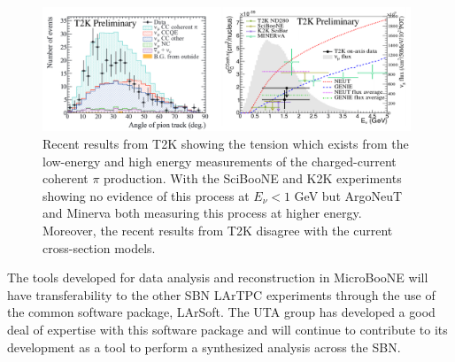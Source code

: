 \begin{figure}[htb]
\centering

\includegraphics[width=0.98\textwidth]{images/CCCohPion.png}
\caption[]{Recent results from T2K \cite{} showing the tension which exists from the low-energy and high energy measurements of the charged-current coherent $\pi$ production. With the SciBooNE and K2K experiments showing no evidence of this process at $E_{\nu} < 1$ GeV but ArgoNeuT and Minerva both measuring this process at higher energy. Moreover, the recent results from T2K disagree with the current cross-section models.}
\label{fig:cccohpion}
\end{figure}


The tools developed for data analysis and reconstruction in MicroBooNE will have transferability to the other SBN LArTPC experiments through the use of the common software package, LArSoft. The UTA group has developed a good deal of expertise with this software package and will continue to contribute to its development as a tool to perform a synthesized analysis across the SBN.

